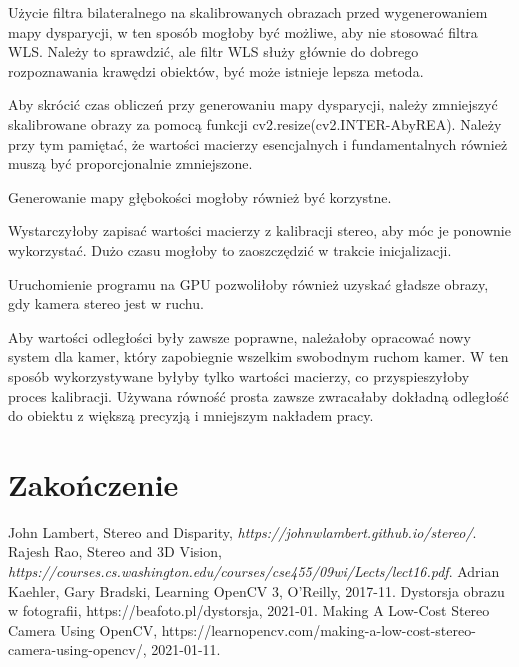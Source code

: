 \documentclass[magisterska]{pracadypl}
\begin{document}
Użycie filtra bilateralnego na skalibrowanych obrazach przed wygenerowaniem mapy dysparycji, w ten sposób mogłoby być możliwe, aby nie stosować filtra WLS. Należy to sprawdzić, ale filtr WLS służy głównie do dobrego rozpoznawania krawędzi obiektów, być może istnieje lepsza metoda.

Aby skrócić czas obliczeń przy generowaniu mapy dysparycji, należy zmniejszyć skalibrowane obrazy za pomocą funkcji cv2.resize(cv2.INTER-AbyREA). Należy przy tym pamiętać, że wartości macierzy esencjalnych i fundamentalnych również muszą być proporcjonalnie zmniejszone.

Generowanie mapy głębokości mogłoby również być korzystne.

Wystarczyłoby zapisać wartości macierzy z kalibracji stereo, aby móc je ponownie wykorzystać. Dużo czasu mogłoby to zaoszczędzić w trakcie inicjalizacji.

Uruchomienie programu na GPU pozwoliłoby również uzyskać gładsze obrazy, gdy kamera stereo jest w ruchu.

Aby wartości odległości były zawsze poprawne, należałoby opracować nowy system dla kamer, który zapobiegnie wszelkim swobodnym ruchom kamer. W ten sposób wykorzystywane byłyby tylko wartości macierzy, co przyspieszyłoby proces kalibracji. Używana równość prosta zawsze zwracałaby dokładną odległość do obiektu z większą precyzją i mniejszym nakładem pracy.

\chapter{Zakończenie}

\listoffigures

\begin{thebibliography}{7}

 John Lambert, Stereo and Disparity, \textit{https://johnwlambert.github.io/stereo/}.
 Rajesh Rao, Stereo and 3D Vision, \textit{https://courses.cs.washington.edu/courses/cse455/09wi/Lects/lect16.pdf}.
 Adrian Kaehler, Gary Bradski, Learning OpenCV 3, O'Reilly, 2017-11.
 Dystorsja obrazu w fotografii, https://beafoto.pl/dystorsja, 2021-01.
 Making A Low-Cost Stereo Camera Using OpenCV, https://learnopencv.com/making-a-low-cost-stereo-camera-using-opencv/, 2021-01-11.

\end{thebibliography}
\end{document}
